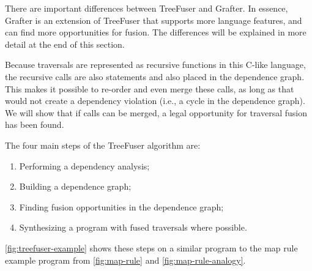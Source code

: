 There are important differences between TreeFuser and Grafter. In essence, Grafter is an extension of TreeFuser that supports more language features, and can find more opportunities for fusion. The differences will be explained in more detail at the end of this section.

Because traversals are represented as recursive functions in this C-like language, the recursive calls are also statements and also placed in the dependence graph. This makes it possible to re-order and even merge these calls, as long as that would not create a dependency violation (i.e., a cycle in the dependence graph). We will show that if calls can be merged, a legal opportunity for traversal fusion has been found.

The four main steps of the TreeFuser algorithm are:
\begin{enumerate}
    \item Performing a dependency analysis;
    \item Building a dependence graph;
    \item Finding fusion opportunities in the dependence graph;
    \item Synthesizing a program with fused traversals where possible.
\end{enumerate}

\autoref{fig:treefuser-example} shows these steps on a similar program to the map rule example program from \autoref{fig:map-rule} and \autoref{fig:map-rule-analogy}.

